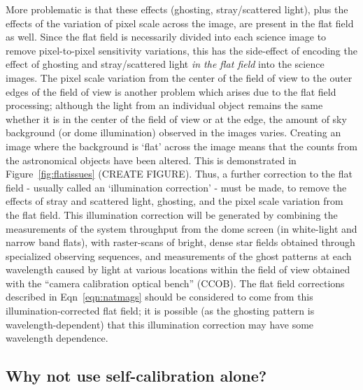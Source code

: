 \documentclass[12pt,preprint]{aastex}
\begin{document}
More problematic is that these effects (ghosting, stray/scattered
light), plus the effects of the variation of pixel scale across the
image, are present in the flat field as well. Since the flat field is
necessarily divided into each science image to remove pixel-to-pixel
sensitivity variations, this has the side-effect of encoding the
effect of ghosting and stray/scattered light {\it in the flat field}
into the science images. The pixel scale variation from the center of
the field of view to the outer edges of the field of view is another
problem which arises due to the flat field processing; although the
light from an individual object remains the same whether it is in the
center of the field of view or at the edge, the amount of sky
background (or dome illumination) observed in the images varies.
Creating an image where the background is `flat' across the image
means that the counts from the astronomical objects have been altered.
This is demonstrated in Figure~\ref{fig:flatissues} (CREATE
FIGURE). Thus, a further correction to the flat field - usually called
an `illumination correction' - must be made, to remove the effects of
stray and scattered light, ghosting, and the pixel scale variation
from the flat field. This illumination correction will be generated by
combining the measurements of the system throughput from the dome
screen (in white-light and narrow band flats), with raster-scans of
bright, dense star fields obtained through specialized observing
sequences, and measurements of the ghost patterns at each wavelength
caused by light at various locations within the field of view obtained
with the ``camera calibration optical bench'' (CCOB).  The flat field
corrections described in Eqn~\ref{eqn:natmags} should be considered to
come from this illumination-corrected flat field; it is possible (as
the ghosting pattern is wavelength-dependent) that this illumination
correction may have some wavelength dependence. 
 
\subsection{Why not use self-calibration alone?}
\end{document}

